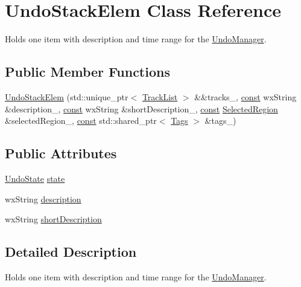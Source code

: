 \hypertarget{struct_undo_stack_elem}{}\section{Undo\+Stack\+Elem Class Reference}
\label{struct_undo_stack_elem}


Holds one item with description and time range for the \hyperlink{class_undo_manager}{Undo\+Manager}.  


\subsection*{Public Member Functions}
\begin{DoxyCompactItemize}
\item 
\hyperlink{struct_undo_stack_elem_acf1b644174a53f2a8c65a2d93f389035}{Undo\+Stack\+Elem} (std\+::unique\+\_\+ptr$<$ \hyperlink{class_track_list}{Track\+List} $>$ \&\&tracks\+\_\+, \hyperlink{getopt1_8c_a2c212835823e3c54a8ab6d95c652660e}{const} wx\+String \&description\+\_\+, \hyperlink{getopt1_8c_a2c212835823e3c54a8ab6d95c652660e}{const} wx\+String \&short\+Description\+\_\+, \hyperlink{getopt1_8c_a2c212835823e3c54a8ab6d95c652660e}{const} \hyperlink{class_selected_region}{Selected\+Region} \&selected\+Region\+\_\+, \hyperlink{getopt1_8c_a2c212835823e3c54a8ab6d95c652660e}{const} std\+::shared\+\_\+ptr$<$ \hyperlink{class_tags}{Tags} $>$ \&tags\+\_\+)
\end{DoxyCompactItemize}
\subsection*{Public Attributes}
\begin{DoxyCompactItemize}
\item 
\hyperlink{struct_undo_state}{Undo\+State} \hyperlink{struct_undo_stack_elem_ac925900ef2b454cf99b170b16305cdbd}{state}
\item 
wx\+String \hyperlink{struct_undo_stack_elem_ad82310a016e4a9679ab6d0b4fe58e3bf}{description}
\item 
wx\+String \hyperlink{struct_undo_stack_elem_aaaed774e0eff7f874640d2d8ace36d92}{short\+Description}
\end{DoxyCompactItemize}


\subsection{Detailed Description}
Holds one item with description and time range for the \hyperlink{class_undo_manager}{Undo\+Manager}. 

